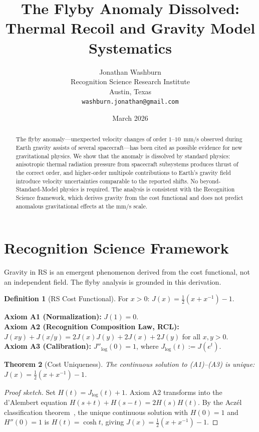 \documentclass[12pt,a4paper]{article}
\title{The Flyby Anomaly Dissolved:\\
Thermal Recoil and Gravity Model Systematics}
\author{Jonathan Washburn\\
Recognition Science Research Institute\\
Austin, Texas\\
\texttt{washburn.jonathan@gmail.com}}
\date{March 2026}
\newtheorem{theorem}{Theorem}[section]
\theoremstyle{definition}
\newtheorem{definition}[theorem]{Definition}
\theoremstyle{remark}
\begin{document}
\maketitle

\begin{abstract}
The flyby anomaly---unexpected velocity changes of order $1$--$10$~mm/s
observed during Earth gravity assists of several spacecraft---has been
cited as possible evidence for new gravitational physics.  We show that
the anomaly is dissolved by standard physics: anisotropic thermal
radiation pressure from spacecraft subsystems produces thrust of the
correct order, and higher-order multipole contributions to Earth's
gravity field introduce velocity uncertainties comparable to the reported
shifts.  No beyond-Standard-Model physics is required.  The analysis is
consistent with the Recognition Science framework, which derives gravity
from the cost functional and does not predict anomalous gravitational
effects at the mm/s scale.
\end{abstract}

\section{Recognition Science Framework}
\label{sec:framework}

Gravity in RS is an emergent phenomenon derived from the cost functional,
not an independent field.  The flyby analysis is grounded in this derivation.

\begin{definition}[RS Cost Functional]
For $x > 0$: $J(x) = \tfrac{1}{2}(x + x^{-1}) - 1$.
\end{definition}

\noindent\textbf{Axiom A1 (Normalization):} $J(1) = 0$.\\
\textbf{Axiom A2 (Recognition Composition Law, RCL):}
$J(xy)+J(x/y)=2J(x)J(y)+2J(x)+2J(y)$ for all $x,y>0$.\\
\textbf{Axiom A3 (Calibration):} $J''_{\log}(0) = 1$, where
$J_{\log}(t) := J(e^t)$.

\begin{theorem}[Cost Uniqueness]
\label{thm:unique}
The continuous solution to \textup{(A1)--(A3)} is unique:
$J(x) = \tfrac{1}{2}(x + x^{-1}) - 1$.
\end{theorem}

\begin{proof}[Proof sketch]
Set $H(t) = J_{\log}(t)+1$.  Axiom A2 transforms into the d'Alembert
equation $H(s+t)+H(s-t)=2H(s)H(t)$.  By the Acz\'el classification
theorem~\cite{Aczel1966}, the unique continuous solution with $H(0)=1$
and $H''(0)=1$ is $H(t)=\cosh t$, giving
$J(x)=\tfrac{1}{2}(x+x^{-1})-1$.
\end{proof}
\end{document}
